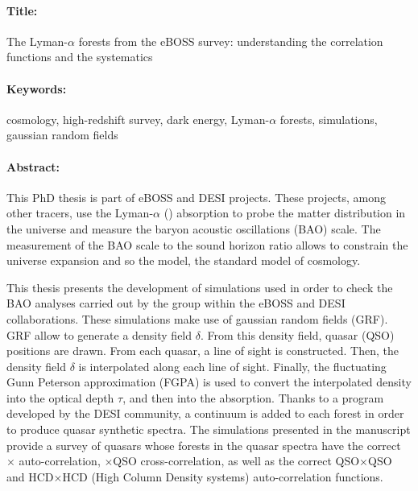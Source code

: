 \newpage
\thispagestyle{empty}
\selectfont
\begin{mdframed}[linecolor=Prune,linewidth=1]
\vspace{-.25cm}
\paragraph*{Title:} The Lyman-$\alpha$ forests from the eBOSS survey: understanding the correlation functions and the systematics

\begin{small}
\vspace{-.25cm}
\paragraph*{Keywords:} cosmology, high-redshift survey, dark energy, Lyman-$\alpha$ forests, simulations, gaussian random fields

\vspace{-.5cm}
\begin{multicols}{2}
  \paragraph*{Abstract:}
  This PhD thesis is part of eBOSS and DESI projects.
  These projects, among other tracers, use the Lyman-$\alpha$ (\lya) absorption to probe the matter distribution in the universe and measure the baryon acoustic oscillations (BAO) scale.
  The measurement of the BAO scale to the sound horizon ratio allows to constrain the universe expansion and so the \lcdm{} model, the standard model of cosmology.

  This thesis presents the development of simulations used in order to check the BAO analyses carried out by the \lya{} group within the eBOSS and DESI collaborations.
  These simulations make use of gaussian random fields (GRF).
  GRF allow to generate a density field $\delta$.
  From this density field, quasar (QSO) positions are drawn. From each quasar, a line of sight is constructed.
  Then, the density field $\delta$ is interpolated along each line of sight.
  Finally, the fluctuating Gunn Peterson approximation (FGPA) is used to convert the interpolated density into the optical depth $\tau$, and then into the \lya{} absorption.
  Thanks to a program developed by the DESI community, a continuum is added to each \lya{} forest in order to produce quasar synthetic spectra.
  The simulations presented in the manuscript provide a survey of quasars whose \lya{} forests in the quasar spectra have the correct \lya{}$\times$\lya{} auto-correlation, \lya{}$\times$QSO cross-correlation, as well as the correct QSO$\times$QSO and HCD$\times$HCD (High Column Density systems) auto-correlation functions.


\end{multicols}
\end{small}
\end{mdframed}
